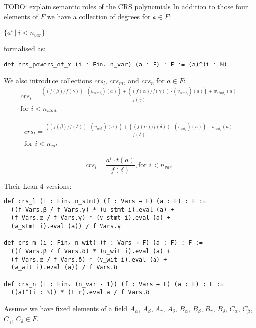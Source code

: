 \documentclass{article}
\theoremstyle{definition}
\theoremstyle{remark}
\begin{document}
TODO: explain semantic roles of the CRS polynomials
In addition to those four elements of $F$ we have a collection of degrees for $a \in F$:
\begin{center}
$\{ a^i \: | \: i < n_{var} \}$
\end{center}
formalised as:
\begin{lstlisting}
def crs_powers_of_x (i : Finₓ n_var) (a : F) : F := (a)^(i : ℕ)
\end{lstlisting}

We also introduce collections $crs_l$, $crs_m$, and $crs_n$ for $a \in F$:
\begin{multline}
crs_l = \frac{((f(\beta) / f(\gamma)) \cdot (u_{{stmt}_i})(a)) + ((f(\alpha) / f(\gamma)) \cdot (v_{{stmt}_i})(a)) + w_{{stmt}_i}(a)}{f(\gamma)} \\ \text{for $i < n_{stmt}$}
\end{multline}

\begin{multline}
crs_l = \frac{((f(\beta) / f(\delta)) \cdot (u_{{wit}_i})(a)) + ((f(\alpha) / f(\delta)) \cdot (v_{{wit}_i})(a)) + w_{{wit}_i}(a)}{f(\delta)} \\ \text{for $i < n_{wit}$}
\end{multline}

\begin{equation}
crs_l = \frac{a^i \cdot t(a)}{f(\delta)}, \text{for $i < n_{var}$}
\end{equation}

Their Lean 4 versions:

\begin{lstlisting}
def crs_l (i : Finₓ n_stmt) (f : Vars → F) (a : F) : F :=
  ((f Vars.β / f Vars.γ) * (u_stmt i).eval (a) +
  (f Vars.α / f Vars.γ) * (v_stmt i).eval (a) +
  (w_stmt i).eval (a)) / f Vars.γ

def crs_m (i : Finₓ n_wit) (f : Vars → F) (a : F) : F :=
  ((f Vars.β / f Vars.δ) * (u_wit i).eval (a) +
  (f Vars.α / f Vars.δ) * (v_wit i).eval (a) +
  (w_wit i).eval (a)) / f Vars.δ

def crs_n (i : Finₓ (n_var - 1)) (f : Vars → F) (a : F) : F :=
  ((a)^(i : ℕ)) * (t r).eval a / f Vars.δ
\end{lstlisting}

Assume we have fixed elements of a field $A_{\alpha}$, $A_{\beta}$, $A_{\gamma}$, $A_{\delta}$, $B_{\alpha}$, $B_{\beta}$, $B_{\gamma}$, $B_{\delta}$, $C_{\alpha}$, $C_{\beta}$, $C_{\gamma}$, $C_{\delta} \in F$.
\end{document}
